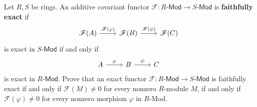 \begin{exercise}
Let $R,S$ be rings. An additive covariant functor $\mathscr{F}:R$-$\mathsf{Mod}\to S$-$\mathsf{Mod}$ is \textbf{faithfully exact} if \[\begin{tikzcd}
\mathscr{F}(A)\ar[r,"\mathscr{F}(\varphi)"]&\mathscr{F}(B)\ar[r,"\mathscr{F}(\psi)"]&\mathscr{F}(C)
\end{tikzcd}\] 
is exact in $S$-$\mathsf{Mod}$ if and only if 
\[\begin{tikzcd}
A\ar[r,"\varphi"]&B\ar[r,"\psi"]&C
\end{tikzcd}\]
is exact in $R$-$\mathsf{Mod}$. Prove that an exact functor $\mathscr{F}:R$-$\mathsf{Mod}\to S$-$\mathsf{Mod}$ is faithfully exact if and only if $\mathscr{F}(M)\neq0$ for every nonzero $R$-module $M$, if and only if $\mathscr{F}(\varphi)\neq0$ for every nonzero morphism $\varphi$ in $R$-Mod.
\end{exercise}
